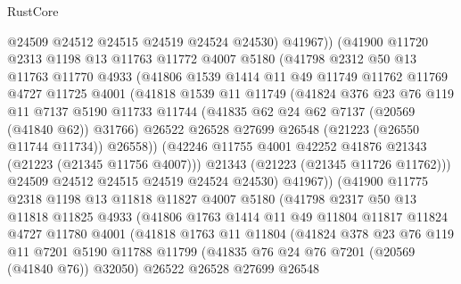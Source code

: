 \begin{lexlean}{RustCore}
\begin{coremodule}
                @24509
                @24512
                @24515
                @24519
                @24524
                @24530)
              @41967))
          (@41900
            @11720
            @2313
            @1198
            @13
            @11763
            @11772
            @4007
            @5180
            (@41798
              @2312
              @50
              @13
              @11763
              @11770
              @4933
              (@41806
                @1539
                @1414
                @11
                @49
                @11749
                @11762
                @11769
                @4727
                @11725
                @4001
                (@41818
                  @1539
                  @11
                  @11749
                  (@41824
                    @376
                    @23
                    @76
                    @119
                    @11
                    @7137
                    @5190
                    @11733
                    @11744
                    (@41835 @62 @24 @62 @7137 (@20569 (@41840 @62)) @31766)
                    @26522
                    @26528
                    @27699
                    @26548
                    (@21223 (@26550 @11744 @11734))
                    @26558))
                (@42246 @11755 @4001 @42252 @41876 @21343 (@21223 (@21345 @11756 @4007)))
                @21343
                (@21223 (@21345 @11726 @11762)))
              @24509
              @24512
              @24515
              @24519
              @24524
              @24530)
            @41967))
        (@41900
          @11775
          @2318
          @1198
          @13
          @11818
          @11827
          @4007
          @5180
          (@41798
            @2317
            @50
            @13
            @11818
            @11825
            @4933
            (@41806
              @1763
              @1414
              @11
              @49
              @11804
              @11817
              @11824
              @4727
              @11780
              @4001
              (@41818
                @1763
                @11
                @11804
                (@41824
                  @378
                  @23
                  @76
                  @119
                  @11
                  @7201
                  @5190
                  @11788
                  @11799
                  (@41835 @76 @24 @76 @7201 (@20569 (@41840 @76)) @32050)
                  @26522
                  @26528
                  @27699
                  @26548

\end{coremodule}
\end{lexlean}
